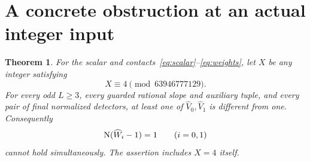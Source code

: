 \documentclass[11pt,a4paper]{article}
\newtheorem{theorem}{Theorem}[section]
\begin{document}
\section{A concrete obstruction at an actual integer input}

\begin{theorem}\label{thm:four}
For the scalar and contacts~\eqref{eq:scalar}--\eqref{eq:weights},
let $X$ be any integer satisfying
\begin{equation}\label{eq:progression}
                  X\equiv4\pmod{63946777129}.
\end{equation}
For every odd $L\ge3$, every guarded rational slope and auxiliary tuple,
and every pair of final normalized detectors, at least one of
$\widehat V_0,\widehat V_1$ is different from one. Consequently
\begin{equation}\label{eq:impossible}
                   \operatorname{N}(\widehat W_i-1)=1\qquad(i=0,1)
\end{equation}
cannot hold simultaneously. The assertion includes $X=4$ itself.
\end{theorem}
\end{document}
